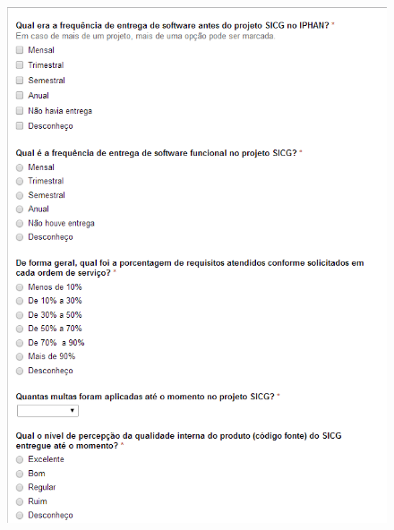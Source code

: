 \begin{apendicesenv}
\begin{figure}[H]
		\centering
			\includegraphics[scale=1.0]{figuras/quest6.png}

		\label{quest6}
\end{figure}


\end{apendicesenv}
